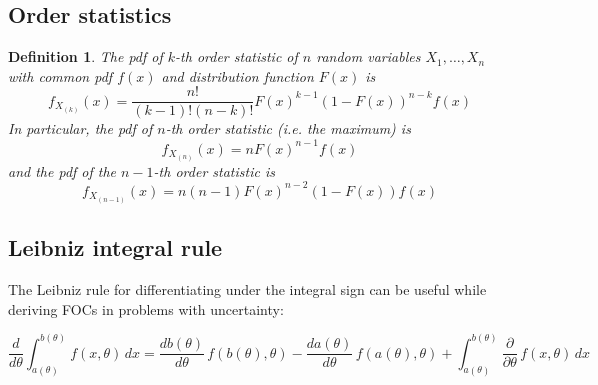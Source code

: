 \documentclass[letter, 11pt]{article}
\theoremstyle{basic}
\newtheorem{definition}{Definition}[section]
\begin{document}
\begin{spacing}{1.0}
\subsection{Order statistics}

\begin{definition}
  The pdf of $k$-th order statistic of $n$ random variables $X_1, \ldots, X_n$
  with common pdf $f(x)$ and distribution function $F(x)$ is \[f_{X_{(k)}}(x) =
  \frac{n!}{(k-1)!(n-k)!}F(x)^{k-1}\left(1-F(x)\right)^{n-k} f(x)\] In
  particular, the pdf of $n$-th order statistic (i.e. the maximum)
  is \[f_{X_{(n)}}(x) = n F(x)^{n-1} f(x)\] and the pdf of the $n-1$-th order
  statistic is \[f_{X_{(n-1)}}(x) = n(n-1) F(x)^{n-2} \left(1-F(x)\right) f(x)\]
\end{definition}

\subsection{Leibniz integral rule}

The Leibniz rule for differentiating under the integral sign can be useful while
deriving FOCs in problems with uncertainty:

\[\frac{d}{d\theta}\int_{a(\theta)}^{b(\theta)} f(x,\theta)\,dx = \frac{d b(\theta)}{d \theta}\,f(b(\theta),\theta)-\frac{d a(\theta)}{d \theta}\,f(a(\theta),\theta)+ \int_{a(\theta)}^{b(\theta)}\frac{\partial}{\partial \theta}\,f(x,\theta)\,dx\]

\end{spacing}
\end{document}
